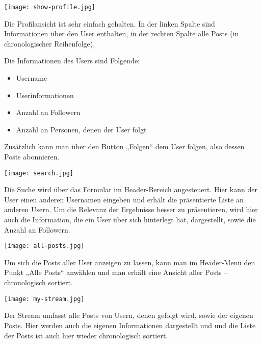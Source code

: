 \newpage
    \begin{center}
      \texttt{[image: show-profile.jpg]}
    \end{center}

    Die Profilansicht ist sehr einfach gehalten. In der linken Spalte sind Informationen über den User enthalten, in der rechten Spalte alle Posts (in chronologischer Reihenfolge).

    Die Informationen des Users sind Folgende:
    \begin{itemize}
      \item Username
      \item Userinformationen
      \item Anzahl an Followern
      \item Anzahl an Personen, denen der User folgt
    \end{itemize}

    Zusätzlich kann man über den Button „Folgen“ dem User folgen, also dessen Posts abonnieren.

\newpage
    \begin{center}
      \texttt{[image: search.jpg]}
    \end{center}

    Die Suche wird über das Formular im Header-Bereich angesteuert. Hier kann der User einen anderen Usernamen eingeben und erhält die präsentierte Liste an anderen Usern. Um die Relevanz der Ergebnisse besser zu präsentieren, wird hier auch die Information, die ein User über sich hinterlegt hat, dargestellt, sowie die Anzahl an Followern.

    \begin{center}
      \texttt{[image: all-posts.jpg]}
    \end{center}

    Um sich die Posts aller User anzeigen zu lassen, kann man im Header-Menü den Punkt „Alle Posts“ anwählen und man erhält eine Ansicht aller Posts – chronologisch sortiert.

\newpage
    \begin{center}
      \texttt{[image: my-stream.jpg]}
    \end{center}

    Der Stream umfasst alle Posts von Usern, denen gefolgt wird, sowie der eigenen Posts. Hier werden auch die eigenen Informationen dargestellt und und die Liste der Posts ist auch hier wieder chronologisch sortiert.

